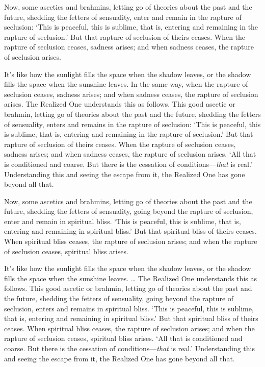 \documentclass[12pt,openany]{book}%
\begin{document}
Now, some ascetics and brahmins, letting go of theories about the past and the future, shedding the fetters of sensuality, enter and remain in the rapture of seclusion: ‘This is peaceful, this is sublime, that is, entering and remaining in the rapture of seclusion.’ But that rapture of seclusion of theirs ceases. When the rapture of seclusion ceases, sadness arises; and when sadness ceases, the rapture of seclusion arises. 

It’s like how the sunlight fills the space when the shadow leaves, or the shadow fills the space when the sunshine leaves. In the same way, when the rapture of seclusion ceases, sadness arises; and when sadness ceases, the rapture of seclusion arises. The Realized One understands this as follows. This good ascetic or brahmin, letting go of theories about the past and the future, shedding the fetters of sensuality, enters and remains in the rapture of seclusion: ‘This is peaceful, this is sublime, that is, entering and remaining in the rapture of seclusion.’ But that rapture of seclusion of theirs ceases. When the rapture of seclusion ceases, sadness arises; and when sadness ceases, the rapture of seclusion arises. ‘All that is conditioned and coarse. But there is the cessation of conditions—\emph{that} is real.’ Understanding this and seeing the escape from it, the Realized One has gone beyond all that. 

Now, some ascetics and brahmins, letting go of theories about the past and the future, shedding the fetters of sensuality, going beyond the rapture of seclusion, enter and remain in spiritual bliss. ‘This is peaceful, this is sublime, that is, entering and remaining in spiritual bliss.’ But that spiritual bliss of theirs ceases. When spiritual bliss ceases, the rapture of seclusion arises; and when the rapture of seclusion ceases, spiritual bliss arises. 

It’s like how the sunlight fills the space when the shadow leaves, or the shadow fills the space when the sunshine leaves. … The Realized One understands this as follows. This good ascetic or brahmin, letting go of theories about the past and the future, shedding the fetters of sensuality, going beyond the rapture of seclusion, enters and remains in spiritual bliss. ‘This is peaceful, this is sublime, that is, entering and remaining in spiritual bliss.’ But that spiritual bliss of theirs ceases. When spiritual bliss ceases, the rapture of seclusion arises; and when the rapture of seclusion ceases, spiritual bliss arises. ‘All that is conditioned and coarse. But there is the cessation of conditions—\emph{that} is real.’ Understanding this and seeing the escape from it, the Realized One has gone beyond all that. 
\end{document}
